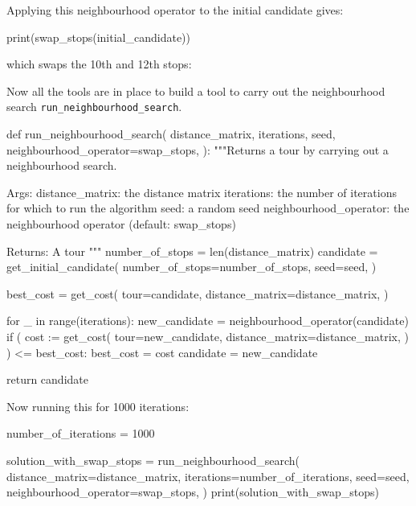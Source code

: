 Applying this neighbourhood operator to the initial candidate gives:

\begin{pyin}
print(swap_stops(initial_candidate))
\end{pyin}

which swaps the 10th and 12th stops:

\begin{pyout}
[0, 7, 12, 5, 11, 3, 9, 2, 8, 1, 4, 10, 6, 0]
\end{pyout}

Now all the tools are in place to build a tool to carry out the
neighbourhood search \texttt{run_neighbourhood_search}.

\begin{pyin}
def run_neighbourhood_search(
    distance_matrix,
    iterations,
    seed,
    neighbourhood_operator=swap_stops,
):
    """Returns a tour by carrying out a neighbourhood search.

    Args:
        distance_matrix: the distance matrix
        iterations: the number of iterations for which to
                    run the algorithm
        seed: a random seed
        neighbourhood_operator: the neighbourhood operator
                                (default: swap_stops)

    Returns:
        A tour
    """
    number_of_stops = len(distance_matrix)
    candidate = get_initial_candidate(
        number_of_stops=number_of_stops,
        seed=seed,
    )

    best_cost = get_cost(
        tour=candidate,
        distance_matrix=distance_matrix,
    )

    for _ in range(iterations):
        new_candidate = neighbourhood_operator(candidate)
        if (
            cost := get_cost(
                tour=new_candidate,
                distance_matrix=distance_matrix,
            )
        ) <= best_cost:
            best_cost = cost
            candidate = new_candidate

    return candidate
\end{pyin}

Now running this for 1000 iterations:

\begin{pyin}
number_of_iterations = 1000

solution_with_swap_stops = run_neighbourhood_search(
    distance_matrix=distance_matrix,
    iterations=number_of_iterations,
    seed=seed,
    neighbourhood_operator=swap_stops,
)
print(solution_with_swap_stops)
\end{pyin}

